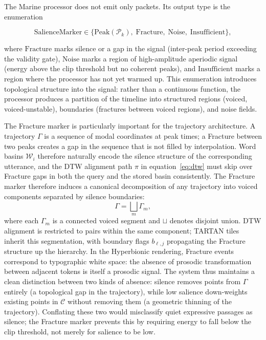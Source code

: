 \documentclass[12pt, a4paper]{article}
\begin{document}
The Marine processor does not emit only packets. Its output type is the enumeration

\begin{equation}
\mathrm{SalienceMarker} \in \{\mathrm{Peak}(\mathcal{P}_k),\; \mathrm{Fracture},\; \mathrm{Noise},\; \mathrm{Insufficient}\},
\label{eq:marker}
\end{equation}

where $\mathrm{Fracture}$ marks silence or a gap in the signal (inter-peak period exceeding the validity gate), $\mathrm{Noise}$ marks a region of high-amplitude aperiodic signal (energy above the clip threshold but no coherent peaks), and $\mathrm{Insufficient}$ marks a region where the processor has not yet warmed up. This enumeration introduces topological structure into the signal: rather than a continuous function, the processor produces a partition of the timeline into structured regions (voiced, voiced-unstable), boundaries (fractures between voiced regions), and noise fields.

The Fracture marker is particularly important for the trajectory architecture. A trajectory $\Gamma$ is a sequence of modal coordinates at peak times; a Fracture between two peaks creates a gap in the sequence that is not filled by interpolation. Word basins $\mathcal{W}_i$ therefore naturally encode the silence structure of the corresponding utterance, and the DTW alignment path $\pi$ in equation~\eqref{eq:dtw} must skip over Fracture gaps in both the query and the stored basin consistently. The Fracture marker therefore induces a canonical decomposition of any trajectory into voiced components separated by silence boundaries:
\begin{equation}
\Gamma = \bigsqcup_{m} \Gamma_m,
\label{eq:decomp}
\end{equation}
where each $\Gamma_m$ is a connected voiced segment and $\sqcup$ denotes disjoint union. DTW alignment is restricted to pairs within the same component; TARTAN tiles inherit this segmentation, with boundary flags $b_{\ell,j}$ propagating the Fracture structure up the hierarchy. In the Hyperbionic rendering, Fracture events correspond to typographic white space: the absence of prosodic transformation between adjacent tokens is itself a prosodic signal. The system thus maintains a clean distinction between two kinds of absence: silence removes points from $\Gamma$ entirely (a topological gap in the trajectory), while low salience down-weights existing points in $\mathcal{C}$ without removing them (a geometric thinning of the trajectory). Conflating these two would misclassify quiet expressive passages as silence; the Fracture marker prevents this by requiring energy to fall below the clip threshold, not merely for salience to be low.
\end{document}

